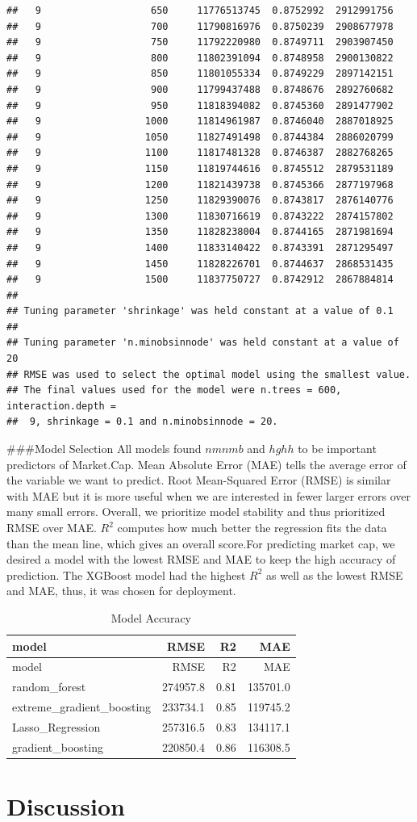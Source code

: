 \documentclass[11pt,]{article}
\begin{document}
\begin{verbatim}
##   9                   650     11776513745  0.8752992  2912991756
##   9                   700     11790816976  0.8750239  2908677978
##   9                   750     11792220980  0.8749711  2903907450
##   9                   800     11802391094  0.8748958  2900130822
##   9                   850     11801055334  0.8749229  2897142151
##   9                   900     11799437488  0.8748676  2892760682
##   9                   950     11818394082  0.8745360  2891477902
##   9                  1000     11814961987  0.8746040  2887018925
##   9                  1050     11827491498  0.8744384  2886020799
##   9                  1100     11817481328  0.8746387  2882768265
##   9                  1150     11819744616  0.8745512  2879531189
##   9                  1200     11821439738  0.8745366  2877197968
##   9                  1250     11829390076  0.8743817  2876140776
##   9                  1300     11830716619  0.8743222  2874157802
##   9                  1350     11828238004  0.8744165  2871981694
##   9                  1400     11833140422  0.8743391  2871295497
##   9                  1450     11828226701  0.8744637  2868531435
##   9                  1500     11837750727  0.8742912  2867884814
## 
## Tuning parameter 'shrinkage' was held constant at a value of 0.1
## 
## Tuning parameter 'n.minobsinnode' was held constant at a value of 20
## RMSE was used to select the optimal model using the smallest value.
## The final values used for the model were n.trees = 600, interaction.depth =
##  9, shrinkage = 0.1 and n.minobsinnode = 20.
\end{verbatim}

\#\#\#Model Selection All models found \(nmnmb\) and \(hghh\) to be
important predictors of Market.Cap. Mean Absolute Error (MAE) tells the
average error of the variable we want to predict. Root Mean-Squared
Error (RMSE) is similar with MAE but it is more useful when we are
interested in fewer larger errors over many small errors. Overall, we
prioritize model stability and thus prioritized RMSE over MAE. \(R^2\)
computes how much better the regression fits the data than the mean
line, which gives an overall score.For predicting market cap, we desired
a model with the lowest RMSE and MAE to keep the high accuracy of
prediction. The XGBoost model had the highest \(R^2\) as well as the
lowest RMSE and MAE, thus, it was chosen for deployment.

\begin{longtable}[]{@{}lrrr@{}}
\caption{Model Accuracy}\tabularnewline
\toprule
model & RMSE & R2 & MAE\tabularnewline
\midrule
\endfirsthead
\toprule
model & RMSE & R2 & MAE\tabularnewline
\midrule
\endhead
random\_forest & 274957.8 & 0.81 & 135701.0\tabularnewline
extreme\_gradient\_boosting & 233734.1 & 0.85 & 119745.2\tabularnewline
Lasso\_Regression & 257316.5 & 0.83 & 134117.1\tabularnewline
gradient\_boosting & 220850.4 & 0.86 & 116308.5\tabularnewline
\bottomrule
\end{longtable}

\hypertarget{discussion}{%
\section{Discussion}\label{discussion}}





\newpage
\singlespacing 
\end{document}
